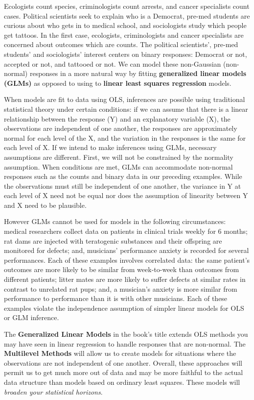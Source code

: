 \documentclass[
]{krantz}
\begin{document}
Ecologists count species, criminologists count arrests, and cancer specialists count cases. Political scientists seek to explain who is a Democrat, pre-med students are curious about who gets in to medical school, and sociologists study which people get tattoos. In the first case, ecologists, criminologists and cancer specialists are concerned about outcomes which are counts. The political scientists', pre-med students' and sociologists' interest centers on binary responses: Democrat or not, accepted or not, and tattooed or not. We can model these non-Gaussian (non-normal) responses in a more natural way by fitting \textbf{generalized linear models (GLMs)} as opposed to using to \textbf{linear least squares regression} models.

When models are fit to data using OLS, inferences are possible using traditional statistical theory under certain conditions: if we can assume that there is a linear relationship between the response (Y) and an explanatory variable (X), the observations are independent of one another, the responses are approximately normal for each level of the X, and the variation in the responses is the same for each level of X. If we intend to make inferences using GLMs, necessary assumptions are different. First, we will not be constrained by the normality assumption. When conditions are met, GLMs can accommodate non-normal responses such as the counts and binary data in our preceding examples. While the observations must still be independent of one another, the variance in Y at each level of X need not be equal nor does the assumption of linearity between Y and X need to be plausible.

However GLMs cannot be used for models in the following circumstances: medical researchers collect data on patients in clinical trials weekly for 6 months; rat dams are injected with teratogenic substances and their offspring are monitored for defects; and, musicians' performance anxiety is recorded for several performances. Each of these examples involves correlated data: the same patient's outcomes are more likely to be similar from week-to-week than outcomes from different patients; litter mates are more likely to suffer defects at similar rates in contrast to unrelated rat pups; and, a musician's anxiety is more similar from performance to performance than it is with other musicians. Each of these examples violate the independence assumption of simpler linear models for OLS or GLM inference.

The \textbf{Generalized Linear Models} in the book's title extends OLS methods you may have seen in linear regression to handle responses that are non-normal. The \textbf{Multilevel Methods} will allow us to create models for situations where the observations are not independent of one another. Overall, these approaches will permit us to get much more out of data and may be more faithful to the actual data structure than models based on ordinary least squares. These models will \emph{broaden your statistical horizons}.
\end{document}
